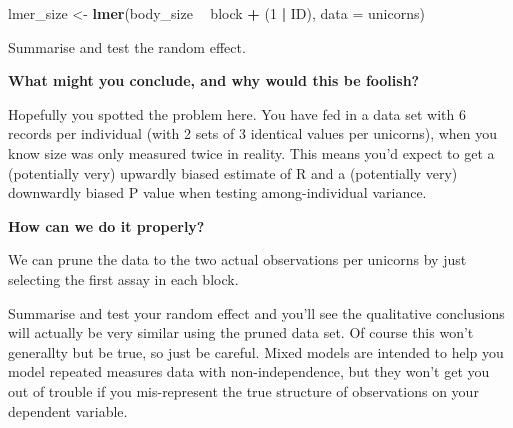 \documentclass[
  12pt,
]{book}
\makeatletter
\newenvironment{Shaded}{\begin{snugshade}}{\end{snugshade}}
\newcommand{\DataTypeTok}[1]{\textcolor[rgb]{0.13,0.29,0.53}{#1}}
\newcommand{\DecValTok}[1]{\textcolor[rgb]{0.00,0.00,0.81}{#1}}
\newcommand{\KeywordTok}[1]{\textcolor[rgb]{0.13,0.29,0.53}{\textbf{#1}}}
\newcommand{\NormalTok}[1]{#1}
\newcommand{\OperatorTok}[1]{\textcolor[rgb]{0.81,0.36,0.00}{\textbf{#1}}}
\newcommand{\StringTok}[1]{\textcolor[rgb]{0.31,0.60,0.02}{#1}}
\newenvironment{kframe}{%
\medskip{}
\setlength{\fboxsep}{.8em}
\def\at@end@of@kframe{}%
\ifinner\ifhmode%
 \def\at@end@of@kframe{\end{minipage}}%
 \begin{minipage}{\columnwidth}%
\fi\fi%
\def\FrameCommand##1{\hskip\@totalleftmargin \hskip-\fboxsep
\colorbox{incolor}{##1}\hskip-\fboxsep
    \hskip-\linewidth \hskip-\@totalleftmargin \hskip\columnwidth}%
\MakeFramed {\advance\hsize-\width
  \@totalleftmargin\z@ \linewidth\hsize
  \@setminipage}}%
{\par\unskip\endMakeFramed%
\at@end@of@kframe}
\newenvironment{rmdblock}[1]
 {
 \begin{itemize}
 \renewcommand{\labelitemi}{
   \raisebox{-.7\height}[0pt][0pt]{
     {\setkeys{Gin}{width=3em,keepaspectratio}\texttt{[image: images/icons/\#1]}}
   }
 }
 \begin{kframe}
 \setlength{\fboxsep}{1em}
 \item
 }
 {
 \end{kframe}
 \end{itemize}
 }
\newenvironment{rmdcode}
  {\begin{rmdblock}{code}}
  {\end{rmdblock}}
\makeatother
\begin{document}
\begin{Shaded}
\begin{Highlighting}[]
\NormalTok{lmer_size <-}\StringTok{ }\KeywordTok{lmer}\NormalTok{(body_size }\OperatorTok{~}\StringTok{ }\NormalTok{block }\OperatorTok{+}\StringTok{ }\NormalTok{(}\DecValTok{1} \OperatorTok{|}\StringTok{ }\NormalTok{ID),}
                \DataTypeTok{data =}\NormalTok{ unicorns)}
\end{Highlighting}
\end{Shaded}

Summarise and test the random effect.

\begin{rmdcode}
\textbf{What might you conclude, and why would this be foolish?}
\end{rmdcode}

Hopefully you spotted the problem here. You have fed in a data set with 6 records per individual (with 2 sets of 3 identical values per unicorns), when you know size was only measured twice in reality. This means you'd expect to get a (potentially very) upwardly biased estimate of R and a (potentially very) downwardly biased P value when testing among-individual variance.

\begin{rmdcode}
\textbf{How can we do it properly?}
\end{rmdcode}

We can prune the data to the two actual observations per unicorns by just selecting the first assay in each block.

\begin{Shaded}
\end{Shaded}

Summarise and test your random effect and you'll see the qualitative conclusions will actually be very similar using the pruned data set. Of course this won't generallty but be true, so just be careful. Mixed models are intended to help you model repeated measures data with non-independence, but they won't get you out of trouble if you mis-represent the true structure of observations on your dependent variable.
\end{document}
